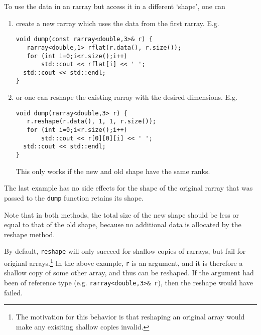 \documentclass[11pt,twoside]{article}
\begin{document}
To use the data in an rarray but access it in a different `shape', one can
\begin{enumerate}
  \item create a new rarray which uses the data from the first rarray. E.g.
\vspace{-9pt}
\begin{framed}\vspace{-3pt}%
\begin{verbatim}
void dump(const rarray<double,3>& r) {
   rarray<double,1> rflat(r.data(), r.size());
   for (int i=0;i<r.size();i++)
       std::cout << rflat[i] << ' ';
  std::cout << std::endl;
}
\end{verbatim}%
\vspace{-12pt}
\end{framed}\vspace{-8pt}
\item or one can reshape the existing rarray with the desired dimensions. E.g.
\vspace{-9pt}
\begin{framed}\vspace{-18pt}%
\begin{verbatim}
void dump(rarray<double,3> r) {
   r.reshape(r.data(), 1, 1, r.size());
   for (int i=0;i<r.size();i++)
       std::cout << r[0][0][i] << ' ';
  std::cout << std::endl;
}
\end{verbatim}%
\vspace{-12pt}
\end{framed}\vspace{-8pt}
This only works if the new and old shape have the same ranks.
\end{enumerate}
The last example has no side effects for the shape of the original rarray that was passed to the \texttt{dump} function retains its shape. 

Note that in both methods, the total size of the new shape should be
less or equal to that of the old shape, because no additional data is
allocated by the reshape method.

By default, \texttt{reshape} will only succeed for shallow copies of
rarrays, but fail for original arrays.\footnote{The motivation for
  this behavior is that reshaping an original array would make any
  exisiting shallow copies invalid.}  In the above example, \texttt{r}
is an argument, and it is therefore a shallow copy of some other
array, and thus can be reshaped. If the argument had been of reference
type (e.g. \texttt{rarray<double,3>\& r}), then the reshape would have
failed.
\end{document}
